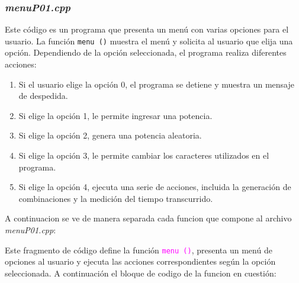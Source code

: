 \documentclass{article}
\begin{document}
        \subsubsection[Menu]{\textit{menuP01.cpp}}
            Este código es un programa que presenta un menú con varias opciones para el usuario. La función \texttt{menu ()} muestra
            el menú y solicita al usuario que elija una opción. Dependiendo de la opción seleccionada, el programa realiza diferentes
            acciones:

            \begin{enumerate}
                \item Si el usuario elige la opción 0, el programa se detiene y muestra un mensaje de despedida.
                \item Si elige la opción 1, le permite ingresar una potencia.
                \item Si elige la opción 2, genera una potencia aleatoria.
                \item Si elige la opción 3, le permite cambiar los caracteres utilizados en el programa.
                \item Si elige la opción 4, ejecuta una serie de acciones, incluida la generación de combinaciones y la medición del tiempo transcurrido.
            \end{enumerate}

            A continuacion se ve de manera separada cada funcion que compone al archivo \textit{menuP01.cpp}:

            Este fragmento de código define la función \textcolor{magenta}{\texttt{menu ()}}, presenta un menú de opciones al usuario y ejecuta las acciones
            correspondientes según la opción seleccionada. A continuación el bloque de codigo de la funcion en cuestión:
\end{document}
